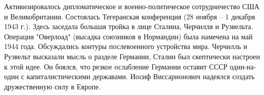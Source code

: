 Активизировалось дипломатическое и военно-политическое сотрудничество США и Великобритании. Состоялась Тегеранская конференция (28 ноября -- 1 декабря 1943 г.). Здесь заседала большая тройка в лице Сталина, Черчилля и Рузвельта. Операция "Оверлоад" (высадка союзников в Нормандии) была намечена на май 1944 года. Обсуждались контуры послевоенного устройства мира. Черчилль и Рузвельт высказали мысль о разделе Германии, Сталин был скептически настроен к этой идее. Он боялся, что резкое ослабление Германии оставит СССР один-на-один с капиталистическими державами. Иосиф Виссарионович надеялся создать дружественную силу в Европе.
